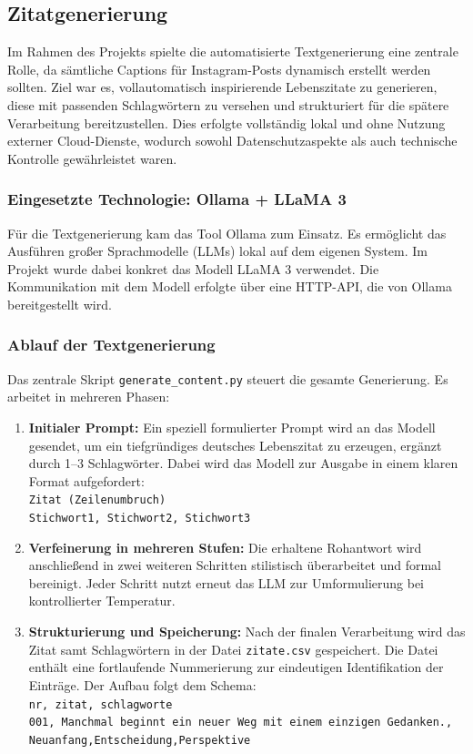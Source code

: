 \documentclass[a4paper,12pt]{article}
\begin{document}
\subsection{Zitatgenerierung}

Im Rahmen des Projekts spielte die automatisierte Textgenerierung eine zentrale Rolle, da sämtliche Captions für Instagram-Posts dynamisch erstellt werden sollten. Ziel war es, vollautomatisch inspirierende Lebenszitate zu generieren, diese mit passenden Schlagwörtern zu versehen und strukturiert für die spätere Verarbeitung bereitzustellen. Dies erfolgte vollständig lokal und ohne Nutzung externer Cloud-Dienste, wodurch sowohl Datenschutzaspekte als auch technische Kontrolle gewährleistet waren.

\subsubsection*{Eingesetzte Technologie: Ollama + LLaMA 3}

Für die Textgenerierung kam das Tool Ollama zum Einsatz. Es ermöglicht das Ausführen großer Sprachmodelle (LLMs) lokal auf dem eigenen System. Im Projekt wurde dabei konkret das Modell LLaMA 3 verwendet. Die Kommunikation mit dem Modell erfolgte über eine HTTP-API, die von Ollama bereitgestellt wird.

\subsubsection*{Ablauf der Textgenerierung}

Das zentrale Skript \texttt{generate\_content.py} steuert die gesamte Generierung. Es arbeitet in mehreren Phasen:

\begin{enumerate}
    \item \textbf{Initialer Prompt:} Ein speziell formulierter Prompt wird an das Modell gesendet, um ein tiefgründiges deutsches Lebenszitat zu erzeugen, ergänzt durch 1–3 Schlagwörter. Dabei wird das Modell zur Ausgabe in einem klaren Format aufgefordert: \\
    \texttt{Zitat (Zeilenumbruch)} \\
    \texttt{Stichwort1, Stichwort2, Stichwort3}
    
    \item \textbf{Verfeinerung in mehreren Stufen:} Die erhaltene Rohantwort wird anschließend in zwei weiteren Schritten stilistisch überarbeitet und formal bereinigt. Jeder Schritt nutzt erneut das LLM zur Umformulierung bei kontrollierter Temperatur.
    
    \item \textbf{Strukturierung und Speicherung:} Nach der finalen Verarbeitung wird das Zitat samt Schlagwörtern in der Datei \texttt{zitate.csv} gespeichert. Die Datei enthält eine fortlaufende Nummerierung zur eindeutigen Identifikation der Einträge. Der Aufbau folgt dem Schema: \\
    \texttt{nr, zitat, schlagworte} \\
    \texttt{001, Manchmal beginnt ein neuer Weg mit einem einzigen Gedanken., Neuanfang,Entscheidung,Perspektive}
\end{enumerate}
\end{document}
